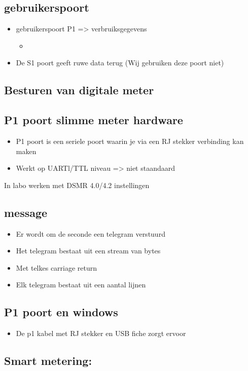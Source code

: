 \documentclass[12pt]{article}
\begin{document}
\subsection{gebruikerspoort}
\begin{itemize}
    \item gebruikerspoort P1 => verbruiksgegevens\begin{itemize}
        \item %
    \end{itemize}
    \item De S1 poort geeft ruwe data terug (Wij gebruiken deze poort niet)
\end{itemize}
\subsection{Besturen van digitale meter}
\subsection{P1 poort slimme meter hardware}
\begin{itemize}
    \item P1 poort is een seriele poort waarin je via een RJ stekker verbinding kan maken
    \item Werkt op UARTl/TTL niveau => niet staandaard
\end{itemize}
In labo werken met DSMR 4.0/4.2 instellingen
\subsection{message}
\begin{itemize}
    \item Er wordt om de seconde een telegram verstuurd
    \item Het telegram bestaat uit een stream van bytes
    \item Met telkes carriage return
    \item Elk telegram bestaat uit een aantal lijnen
\end{itemize}
\subsection{P1 poort en windows}
\begin{itemize}
    \item De p1 kabel met RJ stekker en USB fiche zorgt ervoor 
\end{itemize}
\subsection{Smart metering:}
\end{document}
